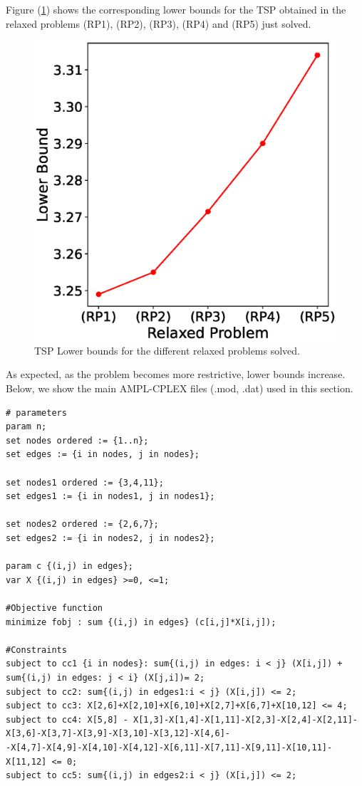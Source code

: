 \documentclass[12pt]{article}
\newenvironment{code}{\captionsetup{type=listing}}{}
\begin{document}
Figure (\ref{ff9}) shows the corresponding lower bounds for the TSP obtained in the relaxed problems (RP1), (RP2), (RP3), (RP4) and (RP5) just solved.

\begin{figure}[H]
\centering
    \includegraphics[width=0.45\linewidth]{ff2.eps} 
  \caption{TSP Lower bounds for the different relaxed problems solved.}
  \label{ff9}
\end{figure}

As expected, as the problem becomes more restrictive, lower bounds increase.\\

Below, we show the main AMPL-CPLEX files (.mod, .dat) used in this section.

\begin{code}
\label{l1}
\begin{lstlisting}[basicstyle=\small]
# parameters
param n;
set nodes ordered := {1..n};
set edges := {i in nodes, j in nodes};

set nodes1 ordered := {3,4,11};
set edges1 := {i in nodes1, j in nodes1};

set nodes2 ordered := {2,6,7};
set edges2 := {i in nodes2, j in nodes2};

param c {(i,j) in edges};
var X {(i,j) in edges} >=0, <=1;

#Objective function
minimize fobj : sum {(i,j) in edges} (c[i,j]*X[i,j]);

#Constraints
subject to cc1 {i in nodes}: sum{(i,j) in edges: i < j} (X[i,j]) + sum{(i,j) in edges: j < i} (X[j,i])= 2; 
subject to cc2: sum{(i,j) in edges1:i < j} (X[i,j]) <= 2; 
subject to cc3: X[2,6]+X[2,10]+X[6,10]+X[2,7]+X[6,7]+X[10,12] <= 4; 
subject to cc4: X[5,8] - X[1,3]-X[1,4]-X[1,11]-X[2,3]-X[2,4]-X[2,11]-X[3,6]-X[3,7]-X[3,9]-X[3,10]-X[3,12]-X[4,6]-
-X[4,7]-X[4,9]-X[4,10]-X[4,12]-X[6,11]-X[7,11]-X[9,11]-X[10,11]-X[11,12] <= 0; 
subject to cc5: sum{(i,j) in edges2:i < j} (X[i,j]) <= 2; 

\end{lstlisting}
\end{code}
\end{document}
